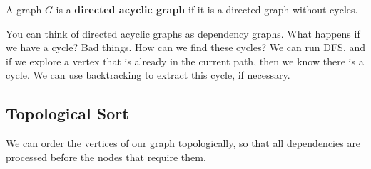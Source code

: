 \begin{definition}
	A graph \( G \) is a \textbf{directed acyclic graph} if it is a directed graph without cycles.
\end{definition}

You can think of directed acyclic graphs as dependency graphs. What happens if we have a cycle? Bad things. How can we find these cycles? We can run DFS, and if we explore a vertex that is already in the current path, then we know there is a cycle. We can use backtracking to extract this cycle, if necessary.

\subsection{Topological Sort}
We can order the vertices of our graph topologically, so that all dependencies are processed before the nodes that require them.
